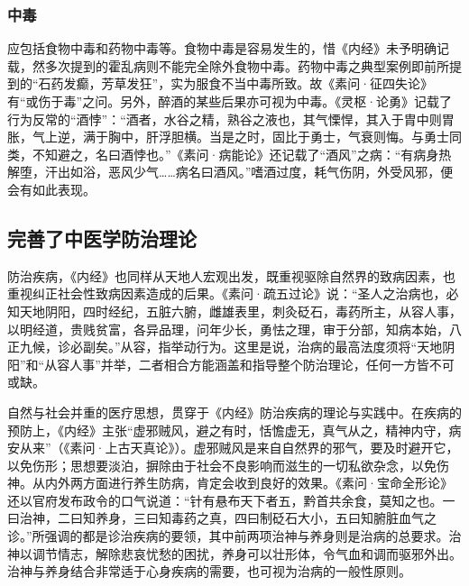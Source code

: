 \documentclass[12pt]{ctexbook}
\begin{document}
\subsubsection{中毒}%

应包括食物中毒和药物中毒等。食物中毒是容易发生的，惜《内经》未予明确记载，然多次提到的霍乱病则不能完全除外食物中毒。药物中毒之典型案例即前所提到的“石药发癫，芳草发狂”，实为服食不当中毒所致。故《素问·征四失论》有“或伤于毒”之问。另外，醉酒的某些后果亦可视为中毒。《灵枢·论勇》记载了行为反常的“酒悖”：“酒者，水谷之精，熟谷之液也，其气慄悍，其入于胄中则胃胀，气上逆，满于胸中，肝浮胆横。当是之时，固比于勇士，气衰则悔。与勇士同类，不知避之，名曰酒悖也。”《素问·病能论》还记载了“酒风”之病：“有病身热解堕，汗出如浴，恶风少气……病名曰酒风。”嗜酒过度，耗气伤阴，外受风邪，便会有如此表现。

\subsection{完善了中医学防治理论}%

防治疾病，《内经》也同样从天地人宏观出发，既重视驱除自然界的致病因素，也重视纠正社会性致病因素造成的后果。《素问·疏五过论》说：“圣人之治病也，必知天地阴阳，四时经纪，五脏六腑，雌雄表里，刺灸砭石，毒药所主，从容人事，以明经道，贵贱贫富，各异品理，问年少长，勇怯之理，审于分部，知病本始，八正九候，诊必副矣。”从容，指举动行为。这里是说，治病的最高法度须将“天地阴阳”和“从容人事”并举，二者相合方能涵盖和指导整个防治理论，任何一方皆不可或缺。

自然与社会并重的医疗思想，贯穿于《内经》防治疾病的理论与实践中。在疾病的预防上，《内经》主张“虚邪贼风，避之有时，恬憺虚无，真气从之，精神内守，病安从来”（《素问·上古天真论》）。虚邪贼风是来自自然界的邪气，要及时避开它，以免伤形；思想要淡泊，摒除由于社会不良影响而滋生的一切私欲杂念，以免伤神。从内外两方面进行养生防病，肯定会收到良好的效果。《素问·宝命全形论》还以官府发布政令的口气说道：“针有悬布天下者五，黔首共余食，莫知之也。一曰治神，二曰知养身，三曰知毒药之真，四曰制砭石大小，五曰知腑脏血气之诊。”所强调的都是诊治疾病的要领，其中前两项治神与养身则是治病的总要求。治神以调节情志，解除悲哀忧愁的困扰，养身可以壮形体，令气血和调而驱邪外出。治神与养身结合非常适于心身疾病的需要，也可视为治病的一般性原则。
\end{document}

